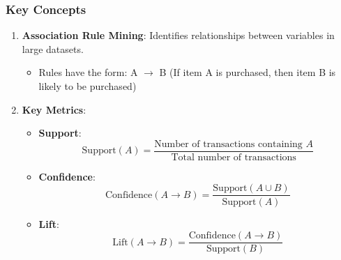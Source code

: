 \documentclass{beamer}
\begin{document}
\begin{frame}[fragile]
    \frametitle{Key Concepts}
    \begin{enumerate}
        \item \textbf{Association Rule Mining}: Identifies relationships between variables in large datasets.
            \begin{itemize}
                \item Rules have the form: A $\rightarrow$ B (If item A is purchased, then item B is likely to be purchased)
            \end{itemize}
            
        \item \textbf{Key Metrics}:
        \begin{itemize}
            \item \textbf{Support}:
            \begin{equation}
                \text{Support}(A) = \frac{\text{Number of transactions containing } A}{\text{Total number of transactions}}
            \end{equation}

            \item \textbf{Confidence}:
            \begin{equation}
                \text{Confidence}(A \rightarrow B) = \frac{\text{Support}(A \cup B)}{\text{Support}(A)}
            \end{equation}

            \item \textbf{Lift}:
            \begin{equation}
                \text{Lift}(A \rightarrow B) = \frac{\text{Confidence}(A \rightarrow B)}{\text{Support}(B)}
            \end{equation}
        \end{itemize}
    \end{enumerate}
\end{frame}
\end{document}
